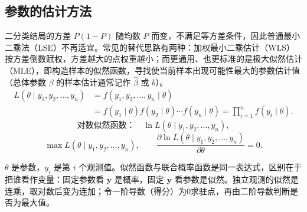\subsection{参数的估计方法}
二分类结局的方差 $P(1-P)$ 随均数 $P$ 而变，不满足等方差条件，因此普通最小二乘法（LSE）不再适宜。常见的替代思路有两种：加权最小二乘估计（WLS）按方差倒数赋权，方差越大的点权重越小；而更通用、也更标准的是极大似然估计（MLE），即构造样本的似然函数，寻找使当前样本出现可能性最大的参数估计值（总体参数 $\beta$ 的样本估计通常记作 $\widehat\beta$ 或 $b$）。
\begin{align*}
L(\theta\mid y_1,y_2,\ldots,y_n)
&=f(y_1,y_2,\ldots,y_n\mid\theta)\\
&=f(y_1\mid\theta)f(y_2\mid\theta)\cdots f(y_n\mid\theta)
=\prod_{i=1}^nf(y_i\mid\theta).
\end{align*}
\[
\text{对数似然函数：}\quad \ln L(\theta\mid y_1,y_2,\ldots,y_n),
\]
\[
\max L(\theta\mid y_1,y_2,\ldots,y_n),\qquad
\frac{\partial\ln L(\theta\mid y_1,y_2,\ldots,y_n)}{\partial\theta}=0.
\]
\begin{annotation}
$\theta$ 是参数，$y_i$ 是第 $i$ 个观测值。似然函数与联合概率函数是同一表达式，区别在于把谁看作变量：固定参数看 $\bm y$ 是概率，固定 $\bm y$ 看参数是似然。独立观测的似然是连乘，取对数后变为连加；令一阶导数（得分）为0求驻点，再由二阶导数判断是否为最大值。
\end{annotation}
